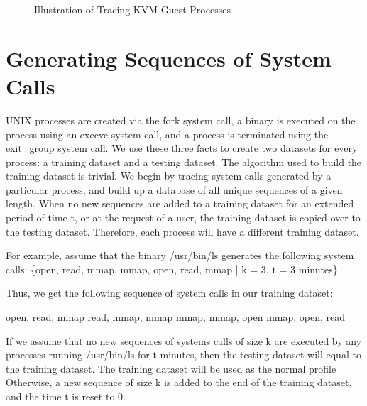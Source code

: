\documentclass{report}
\begin{document}
\begin{spacing}{1.5}
\begin{figure}[ht]
\centering
  \caption{Illustration of Tracing KVM Guest Processes}
\end{figure}




\section{Generating Sequences of System Calls}

{\large
UNIX processes are created via the fork system call, a binary is executed on the process using an execve system call, and a process is terminated using the exit\_group system call. We use these three facts to create two datasets for every process: a training dataset and a testing dataset. The algorithm used to build the training dataset is trivial. We begin by tracing system calls generated by a particular process, and build up a database of all unique sequences of a given length. When no new sequences are added to a training dataset for an extended period of time t, or at the request of a user, the training dataset is copied over to the testing dataset. Therefore, each process will have a different training dataset.
\newline
}

{\large
\noindent For example, assume that the binary /usr/bin/ls generates the following system calls:
\newline \newline
\indent \indent \indent \{open, read, mmap, mmap, open, read, mmap \big|  k = 3, t = 3 minutes\}
\leavevmode\newline
}

{\large
\noindent Thus, we get the following sequence of system calls in our training dataset: \newline

\indent \indent \indent open, read, mmap \newline
\indent \indent \indent read, mmap, mmap \newline
\indent \indent \indent mmap, mmap, open \newline
\indent \indent \indent mmap, open, read \newline

\noindent If we assume that no new sequences of systems calls of size k are executed by any processes running /usr/bin/ls for t minutes, then the testing dataset will equal to the training dataset. The training dataset will be used as the normal profile Otherwise, a new sequence of size k is added to the end of the training dataset, and the time t is reset to 0.
}


\end{spacing}
\end{document}

